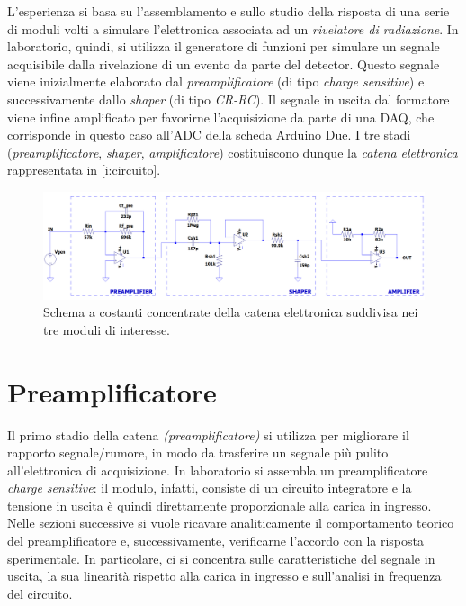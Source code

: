 \documentclass[a4paper,11pt]{article} %
\begin{document}
L'esperienza si basa su l'assemblamento e sullo studio della risposta di una serie di moduli volti a simulare
l'elettronica associata ad un \textit{rivelatore di radiazione}. In laboratorio, quindi, si utilizza il generatore di
funzioni per simulare un segnale acquisibile dalla rivelazione di un evento da parte del detector. Questo segnale viene
inizialmente elaborato dal \textit{preamplificatore} (di tipo \textit{charge sensitive}) e successivamente dallo
\textit{shaper} (di tipo \textit{CR-RC}). Il segnale in uscita dal formatore viene infine amplificato per favorirne
l'acquisizione da parte di una DAQ, che corrisponde in questo caso all'ADC della scheda Arduino Due. I tre stadi
(\textit{preamplificatore}, \textit{shaper}, \textit{amplificatore}) costituiscono dunque la \textit{catena elettronica}
rappresentata in \autoref{i:circuito}.

\begin{figure}[H]
	\centering
	\includegraphics[width=0.9\linewidth]{../Simulations/catena_circuito.png}
	\caption{\small Schema a costanti concentrate della catena elettronica suddivisa nei tre moduli di interesse.}
	\label{i:circuito}
\end{figure}



\section{Preamplificatore}\label{s:preamp} 

Il primo stadio della catena \textit{(preamplificatore)} si utilizza per migliorare il rapporto segnale/rumore, in modo
da trasferire un segnale più pulito all'elettronica di acquisizione. In laboratorio si assembla un preamplificatore
\textit{charge sensitive}: il modulo, infatti, consiste di un circuito integratore e la tensione in uscita è quindi
direttamente proporzionale alla carica in ingresso. Nelle sezioni successive si vuole ricavare analiticamente il
comportamento teorico del preamplificatore e, successivamente, verificarne l'accordo con la risposta sperimentale. In
particolare, ci si concentra sulle caratteristiche del segnale in uscita, la sua linearità rispetto alla carica in
ingresso e sull'analisi in frequenza del circuito.
\end{document}
